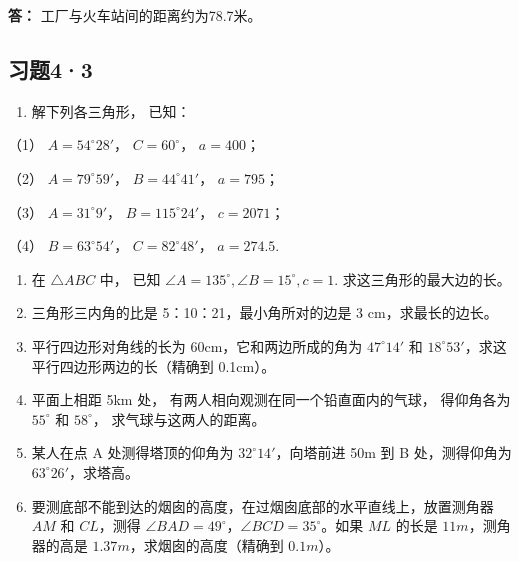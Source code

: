 \textbf{答：} 工厂与火车站间的距离约为78.7米。

\subsection{习题4·3}

\begin{enumerate}
\item
  解下列各三角形， 已知：
\end{enumerate}

（1） \(A = 54^{\circ}28'\)， \(C = 60^{\circ}\)， \(a = 400\)；

（2） \(A = 79^{\circ}59'\)， \(B = 44^{\circ}41'\)， \(a = 795\)；

（3） \(A = 31^{\circ}9'\)， \(B = 115^{\circ}24'\)， \(c = 2071\)；

（4） \(B = 63^{\circ}54'\)， \(C = 82^{\circ}48'\)， \(a = 274.5\).

\begin{enumerate}[start=2]
\item
  在 \(\triangle ABC\) 中， 已知
  \(\angle A = 135^{\circ}, \angle B = 15^{\circ}, c = 1\).
  求这三角形的最大边的长。
\item
  三角形三内角的比是 5：10：21，最小角所对的边是 3 cm，求最长的边长。
\item
  平行四边形对角线的长为 60cm，它和两边所成的角为 \(47^{\circ}14'\) 和
  \(18^{\circ}53'\)，求这平行四边形两边的长（精确到 0.1cm）。
\item
  平面上相距 5km 处， 有两人相向观测在同一个铅直面内的气球， 得仰角各为
  \(55^{\circ}\) 和 \(58^{\circ}\)， 求气球与这两人的距离。
\item
  某人在点 A 处测得塔顶的仰角为 \(32^{\circ}14'\)，向塔前进 50m 到 B
  处，测得仰角为 \(63^{\circ}26'\)，求塔高。
\item
  要测底部不能到达的烟囱的高度，在过烟囱底部的水平直线上，放置测角器
  \(AM\) 和 \(CL\)，测得
  \(\angle BAD = 49^\circ\)，\(\angle BCD = 35^\circ\)。如果 \(ML\)
  的长是 \(11m\)，测角器的高是 \(1.37m\)，求烟囱的高度（精确到
  \(0.1m\)）。
\end{enumerate}

